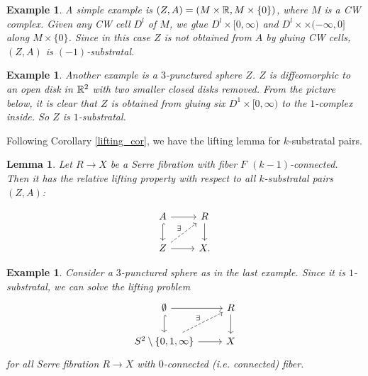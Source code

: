 \documentclass{article}
\newtheorem{lemma}[theorem]{Lemma}
\newtheorem{example}[theorem]{Example}
\newtheorem{proposed work}[theorem]{Proposed Work}
\theoremstyle{definition}
\begin{document}
\begin{example}
A simple example is $(Z,A) = (M\times\mathbb R,M\times\{0\})$, where $M$ is a CW complex. Given any CW cell $D^l$ of $M$, we glue $D^l\times [0,\infty)$ and $D^l\times\times (-\infty,0]$ along $M\times \{0\}$. Since in this case $Z$ is not obtained from $A$ by gluing CW cells, $(Z,A)$ is $(-1)$-substratal.
\end{example}

\begin{example}
Another example is a $3$-punctured sphere $Z$. $Z$ is diffeomorphic to an open disk in $\mathbb R^2$ with two smaller closed disks removed. From the picture below, it is clear that $Z$ is obtained from gluing six $D^1\times [0,\infty)$ to the $1$-complex inside. So $Z$ is $1$-substratal.
\begin{figure}[h]
\centering
\end{figure}
\end{example}

Following Corollary \ref{lifting_cor}, we have the lifting lemma for $k$-substratal pairs.

\begin{lemma}
\label{substratal_lift}
Let $R\to X$ be a Serre fibration with fiber $F$ $(k-1)$-connected. Then it has the relative lifting property with respect to all $k$-substratal pairs $(Z, A)$:

\begin{equation*}
\begin{tikzcd}
A \arrow[r] \arrow[hookrightarrow]{d}
& R \arrow[d]
\\
Z \arrow[r] \arrow[dashed,ur,"\exists"]
& X.
\end{tikzcd}
\end{equation*}
\end{lemma}

\begin{example}
Consider a $3$-punctured sphere as in the last example. Since it is $1$-substratal, we can solve the lifting problem
\begin{equation*}
\begin{tikzcd}
\emptyset \arrow[r] \arrow[hookrightarrow]{d}
& R \arrow[d]
\\
S^2\setminus\{0,1,\infty\} \arrow[r] \arrow[dashed,ur,"\exists"]
& X
\end{tikzcd}
\end{equation*}
for all Serre fibration $R\to X$ with $0$-connected (i.e. connected) fiber.
\end{example}
\end{document}

